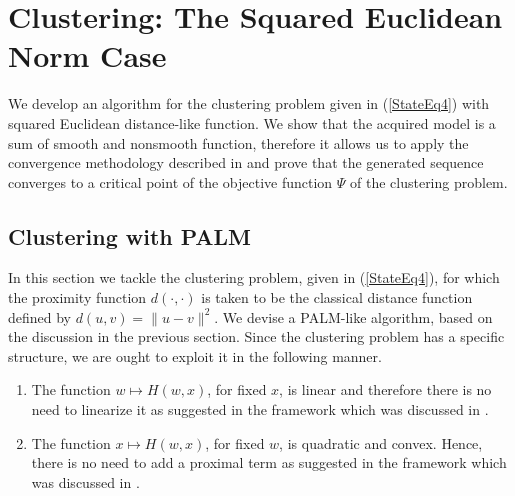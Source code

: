  \chapter{Clustering: The Squared Euclidean Norm Case} \label{Chapter3}

\noindent \noindent \hrulefill

We develop an algorithm for the clustering problem given in (\ref{StateEq4}) with squared Euclidean distance-like function. We show that the acquired model is a sum of smooth and nonsmooth function, therefore it allows us to apply the convergence methodology described in  and prove that the generated sequence converges to a critical point of the objective function $\Psi$ of the clustering problem.

\noindent \noindent \hrulefill

\section{Clustering with PALM}\label{State_Clustering_SqNorm}

In this section we tackle the clustering problem, given in (\ref{StateEq4}), for which the proximity function $d(\cdot,\cdot)$ is taken to be the classical distance function defined by $d(u,v) = \|u-v\|^2$. We devise a PALM-like algorithm, based on the discussion in the previous section.
Since the clustering problem has a specific structure, we are ought to exploit it in the following manner.
\begin{enumerate}[(1)]
	\item The function $w \mapsto H(w,x)$, for fixed $x$, is linear and therefore there is no need to linearize it as suggested in the framework which was discussed in .
	\item The function $x \mapsto H(w,x)$, for fixed $w$, is quadratic and convex. Hence, there is no need to add a proximal term as suggested in the framework which was discussed in .
\end{enumerate}

